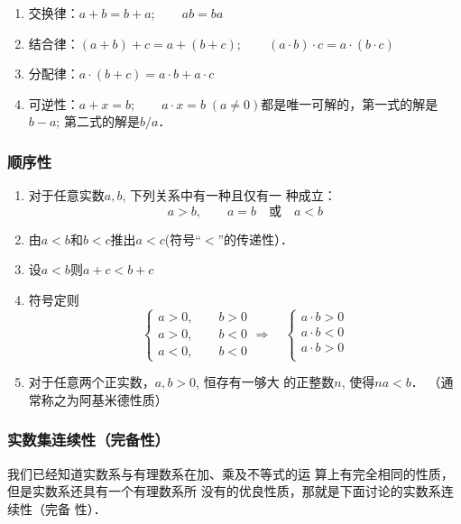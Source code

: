 \begin{enumerate}
    \item 交换律：$a+b=b+a;\qquad  ab=ba$
    \item 结合律：$(a+b)+c=a+(b+c);\qquad (a\cdot b)\cdot c=a\cdot (b\cdot c)$
    \item 分配律：$a\cdot (b+c)=a\cdot b+a\cdot c$
   \item 可逆性：$a+x=b;\qquad a\cdot x=b\; (a\ne 0)$都是唯一可解的，第一式的解是$b-a$; 第二式的解是$b/a$．
\end{enumerate}

\subsubsection{顺序性}
\begin{enumerate}
    \item 对于任意实数$a,b$, 下列关系中有一种且仅有一
    种成立：
    \[a>b,\qquad a=b\quad \text{或}\quad a<b\]
    \item 由$a<b$和$b<c$推出$a<c$(符号“$<$”的传递性）．
    \item 设$a<b$则$a+c<b+c$
    \item 符号定则
    \[\begin{cases}
        a>0,\qquad b>0\\
        a>0,\qquad b<0\\
        a<0,\qquad b<0
    \end{cases}\Rightarrow\quad  \begin{cases}
        a\cdot b>0\\a\cdot b<0\\a\cdot b>0\\
    \end{cases}\]
    \item 对于任意两个正实数，$a,b>0$, 恒存有一够大
    的正整数$n$, 使得$na<b$． （通常称之为阿基米德性质）
\end{enumerate}

\subsubsection{ 实数集连续性（完备性）}
我们已经知道实数系与有理数系在加、乘及不等式的运
算上有完全相同的性质，但是实数系还具有一个有理数系所
没有的优良性质，那就是下面讨论的实数系连续性（完备
性）．

